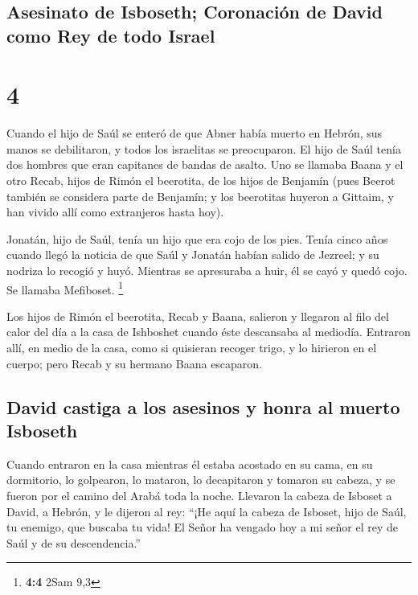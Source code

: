 \begin{paracol}{2}
{\subsection{Asesinato de Isboseth; Coronación de David como Rey de todo
Israel}\label{asesinato-de-isboseth-coronaciuxf3n-de-david-como-rey-de-todo-israel}}

\hypertarget{section-6}{%
\section{4}\label{section-6}}

 Cuando el hijo de Saúl se enteró de que Abner había
muerto en Hebrón, sus manos se debilitaron, y todos los israelitas se
preocuparon.  El hijo de Saúl tenía dos hombres que eran
capitanes de bandas de asalto. Uno se llamaba Baana y el otro Recab,
hijos de Rimón el beerotita, de los hijos de Benjamín (pues Beerot
también se considera parte de Benjamín;  y los beerotitas
huyeron a Gittaim, y han vivido allí como extranjeros hasta hoy).

 Jonatán, hijo de Saúl, tenía un hijo que era cojo de los
pies. Tenía cinco años cuando llegó la noticia de que Saúl y Jonatán
habían salido de Jezreel; y su nodriza lo recogió y huyó. Mientras se
apresuraba a huir, él se cayó y quedó cojo. Se llamaba Mefiboset.
\footnote{\textbf{4:4} 2Sam 9,3}

 Los hijos de Rimón el beerotita, Recab y Baana, salieron
y llegaron al filo del calor del día a la casa de Ishboshet cuando éste
descansaba al mediodía.  Entraron allí, en medio de la
casa, como si quisieran recoger trigo, y lo hirieron en el cuerpo; pero
Recab y su hermano Baana escaparon.

\hypertarget{david-castiga-a-los-asesinos-y-honra-al-muerto-isboseth}{%
\subsection{David castiga a los asesinos y honra al muerto
Isboseth}\label{david-castiga-a-los-asesinos-y-honra-al-muerto-isboseth}}

 Cuando entraron en la casa mientras él estaba acostado en
su cama, en su dormitorio, lo golpearon, lo mataron, lo decapitaron y
tomaron su cabeza, y se fueron por el camino del Arabá toda la noche.
 Llevaron la cabeza de Isboset a David, a Hebrón, y le
dijeron al rey: ``¡He aquí la cabeza de Isboset, hijo de Saúl, tu
enemigo, que buscaba tu vida! El Señor ha vengado hoy a mi señor el rey
de Saúl y de su descendencia.''


\end{paracol}
